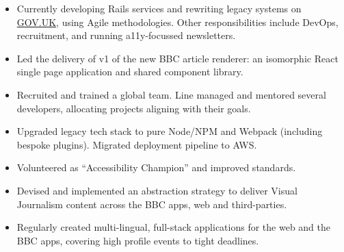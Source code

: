 \documentclass[10pt,a4paper,ragged2e,withhyper]{altacv}
\begin{document}
\begin{paracol}{2}


\begin{itemize}
    \item Currently developing Rails services and rewriting legacy systems on \url{GOV.UK}, using Agile methodologies. Other responsibilities include DevOps, recruitment, and running a11y-focussed newsletters.
\end{itemize}

\divider

\begin{itemize}
    \item Led the delivery of v1 of the new BBC article renderer: an isomorphic React single page application and shared component library.
\end{itemize}

\divider


\begin{itemize}
    \item Recruited and trained a global team. Line managed and mentored several developers, allocating projects aligning with their goals.
    \item Upgraded legacy tech stack to pure Node/NPM and Webpack (including bespoke plugins). Migrated deployment pipeline to AWS.
    \item Volunteered as ``Accessibility Champion'' and improved standards.
\end{itemize}

\divider


\begin{itemize}
    \item Devised and implemented an abstraction strategy to deliver Visual Journalism content across the BBC apps, web and third-parties.
    \item Regularly created multi-lingual, full-stack applications for the web and the BBC apps, covering high profile events to tight deadlines.
\end{itemize}


\end{paracol}
\end{document}
